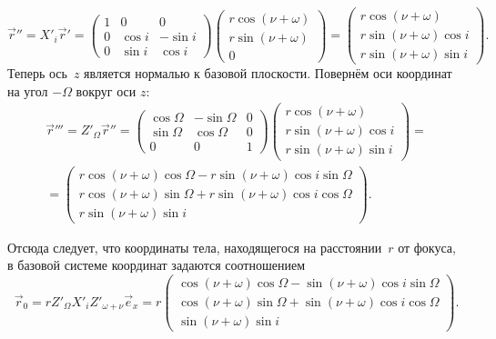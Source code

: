 \begin{equation*}
    \vec r'' = X'_i\vec r' 
    = \begin{pmatrix}
        1 & 0 & 0\\
        0 & \cos i & - \sin i\\
        0 & \sin i & \cos i
    \end{pmatrix}\begin{pmatrix}
        r \cos (\nu + \omega)\\
        r \sin (\nu + \omega)\\
        0
    \end{pmatrix} 
    = \begin{pmatrix}
        r \cos (\nu + \omega)\\
        r \sin (\nu + \omega) \cos i\\
        r \sin (\nu + \omega) \sin i
    \end{pmatrix}.
\end{equation*}
Теперь ось~$z$ является нормалью к базовой плоскости. Повернём оси координат на угол $-\Omega$ вокруг оси $z$:
\begin{multline*}
    \vec r''' = Z'_\Omega\vec r''
    = \begin{pmatrix}
        \cos \Omega & - \sin \Omega & 0\\
        \sin \Omega & \cos \Omega & 0\\
        0 & 0 & 1
    \end{pmatrix}\begin{pmatrix}
        r \cos (\nu + \omega)\\
        r \sin (\nu + \omega) \cos i\\
        r \sin (\nu + \omega) \sin i
    \end{pmatrix} = \\
    = \begin{pmatrix}
        r \cos (\nu + \omega) \cos \Omega - r \sin (\nu + \omega) \cos i \sin \Omega\\
        r \cos (\nu + \omega) \sin \Omega + r \sin (\nu + \omega) \cos i \cos \Omega\\
        r \sin (\nu + \omega) \sin i
    \end{pmatrix}.
\end{multline*}

Отсюда следует, что координаты тела, находящегося на расстоянии~$r$ от фокуса, в базовой системе координат задаются соотношением
\begin{equation*}
    \vec r_0 =
    r Z'_\Omega X'_i Z'_{\omega + \nu} \vec e_x =
    r \begin{pmatrix}
        \cos (\nu + \omega) \cos \Omega - \sin (\nu + \omega) \cos i \sin \Omega\\
        \cos (\nu + \omega) \sin \Omega + \sin (\nu + \omega) \cos i \cos \Omega\\
        \sin (\nu + \omega) \sin i
    \end{pmatrix}.
\end{equation*}








